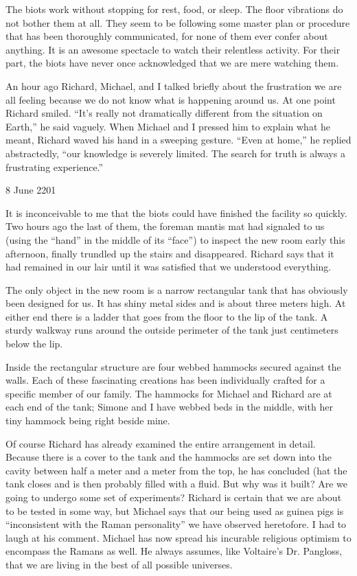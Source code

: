 \documentclass[]{article}
\begin{document}
The biots work without stopping for rest, food, or sleep. The floor vibrations do not bother them at all. They seem to be following some master plan or procedure that has been thoroughly communicated, for none of them ever confer about anything. It is an awesome spectacle to watch their relentless activity. For their part, the biots have never once acknowledged that we are mere watching them.

An hour ago Richard, Michael, and I talked briefly about the frustration we are all feeling because we do not know what is happening around us. At one point Richard smiled. “It’s really not dramatically different from the situation on Earth,” he said vaguely. When Michael and I pressed him to explain what he meant, Richard waved his hand in a sweeping gesture. “Even at home,” he replied abstractedly, “our knowledge is severely limited. The search for truth is always a frustrating experience.”

8 June 2201

It is inconceivable to me that the biots could have finished the facility so quickly. Two hours ago the last of them, the foreman mantis mat had signaled to us (using the “hand” in the middle of its “face”) to inspect the new room early this afternoon, finally trundled up the stairs and disappeared. Richard says that it had remained in our lair until it was satisfied that we understood everything.

The only object in the new room is a narrow rectangular tank that has obviously been designed for us. It has shiny metal sides and is about three meters high. At either end there is a ladder that goes from the floor to the lip of the tank. A sturdy walkway runs around the outside perimeter of the tank just centimeters below the lip.

Inside the rectangular structure are four webbed hammocks secured against the walls. Each of these fascinating creations has been individually crafted for a specific member of our family. The hammocks for Michael and Richard are at each end of the tank; Simone and I have webbed beds in the middle, with her tiny hammock being right beside mine.

Of course Richard has already examined the entire arrangement in detail. Because there is a cover to the tank and the hammocks are set down into the cavity between half a meter and a meter from the top, he has concluded (hat the tank closes and is then probably filled with a fluid. But why was it built? Are we going to undergo some set of experiments? Richard is certain that we are about to be tested in some way, but Michael says that our being used as guinea pigs is “inconsistent with the Raman personality” we have observed heretofore. I had to laugh at his comment. Michael has now spread his incurable religious optimism to encompass the Ramans as well. He always assumes, like Voltaire’s Dr. Pangloss, that we are living in the best of all possible universes.
\end{document}
